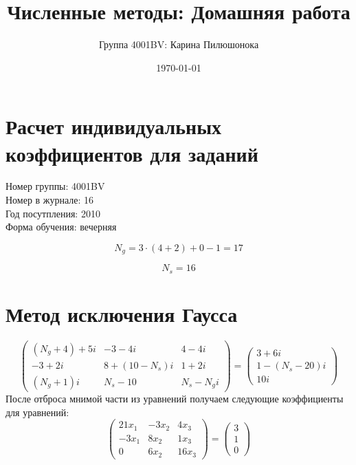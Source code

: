 \documentclass{article}
\title{Численные методы: Домашняя работа}
\author{Группа 4001BV: Карина Пилюшонока}
\date \today
\begin{document}
\maketitle
\newpage
\tableofcontents
\newpage
\section{Расчет индивидуальных коэффициентов для заданий}
Номер группы: 4001BV \\
Номер в журнале: 16 \\
Год посутпления: 2010 \\
Форма обучения: вечерняя

\begin{displaymath} 
  N_{g} = 3 \cdot (4 + 2) + 0 - 1 = 17
\end{displaymath}

\begin{displaymath}
  N_{s} = 16
\end{displaymath}
\section{Метод исключения Гаусса}

\begin{displaymath}
\left(
  \begin{array}{ccc}
    (N_{g}+4)+5i & -3-4i & 4-4i \\
    -3+2i & 8+(10-N_{s})i & 1+2i \\
    (N_{g}+1)i & N_{s}-10 & N_{s}-N_{g}i
  \end{array}
\right)
=
\left(
  \begin{array}{ccc}
    3+6i\\
    1-(N_{s}-20)i\\
    10i
  \end{array}
\right)
\end{displaymath}
После отброса мнимой части из уравнений получаем следующие коэффициенты для
уравнений:
\begin{displaymath}
\left(
  \begin{array}{ccc}
    21 x_{1} & -3 x_{2} & 4 x_{3} \\
    -3 x_{1} & 8 x_{2} & 1 x_{3} \\
    0 & 6 x_{2} & 16 x_{3}
  \end{array}
\right)
=
\left(
  \begin{array}{ccc}
    3\\
    1\\
    0
  \end{array}
\right)
\end{displaymath}
\end{document}
